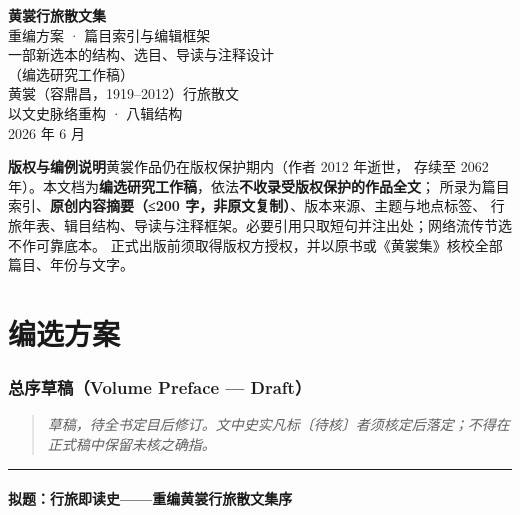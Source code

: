 \documentclass[UTF8,fontset=none,zihao=-4,a4paper]{ctexart}
\newcommand{\kai}{\CJKfamily{zhkai}}
\begin{document}
\sloppy



\begin{titlepage}
\centering
\vspace*{3cm}
{\sffamily\bfseries\fontsize{30}{36}\selectfont 黄裳行旅散文集}\\[6pt]
{\kai\Large 重编方案 · 篇目索引与编辑框架}\\[2.2cm]
{\large 一部新选本的结构、选目、导读与注释设计}\\[0.4cm]
{\large（编选研究工作稿）}\\[3cm]
{\large 黄裳（容鼎昌，1919--2012）行旅散文}\\[0.3cm]
{\large 以文史脉络重构 · 八辑结构}\\[2.5cm]
{\normalsize 2026 年 6 月}\\
\vfill
\begin{tcolorbox}[colback=gray!6,colframe=gray!55,boxrule=0.6pt,
  arc=2pt,left=10pt,right=10pt,top=8pt,bottom=8pt,width=0.92\linewidth]
\small
\textbf{版权与编例说明}\quad 黄裳作品仍在版权保护期内（作者 2012 年逝世，
存续至 2062 年）。本文档为\textbf{编选研究工作稿}，依法\textbf{不收录受版权保护的作品全文}；
所录为篇目索引、\textbf{原创内容摘要（≤200 字，非原文复制）}、版本来源、主题与地点标签、
行旅年表、辑目结构、导读与注释框架。必要引用只取短句并注出处；网络流传节选不作可靠底本。
正式出版前须取得版权方授权，并以原书或《黄裳集》核校全部篇目、年份与文字。
\end{tcolorbox}
\end{titlepage}


\tableofcontents

\clearpage

\part{编选方案}

\section{总序草稿（Volume Preface — Draft）}


\begin{quote}\small\itshape
草稿，待全书定目后修订。文中史实凡标〔待核〕者须核定后落定；不得在正式稿中保留未核之确指。
\end{quote}

\medskip\hrule\medskip

\subsection{拟题：行旅即读史——重编黄裳行旅散文集序}
\end{document}
